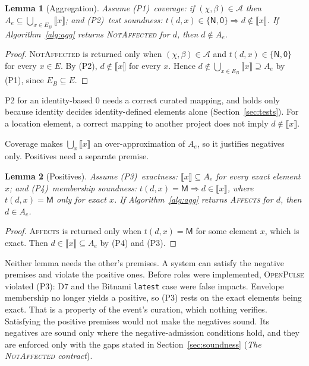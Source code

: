 \documentclass[11pt,a4paper]{article}
\newtheorem{lemma}{Lemma}
\newcommand{\op}{\textsc{OpenPulse}}
\newcommand{\code}[1]{\texttt{#1}}
\newcommand{\Mem}{\textsf{M}}
\newcommand{\Non}{\textsf{N}}
\newcommand{\NoA}{\textsf{0}}
\begin{document}
\begin{lemma}[Aggregation]
\label{lem:agg}
Assume (P1)~\emph{coverage}: if $(\chi, \beta) \in \mathcal{A}$ then
$A_e \subseteq \bigcup_{x \in E_B} \llbracket x \rrbracket$; and
(P2)~\emph{test soundness}: $t(d,x) \in \{\Non, \NoA\} \Rightarrow
d \notin \llbracket x \rrbracket$. If Algorithm~\ref{alg:agg} returns
\textsc{NotAffected} for $d$, then $d \notin A_e$.
\end{lemma}
\begin{proof}
\textsc{NotAffected} is returned only when $(\chi, \beta) \in
\mathcal{A}$ and $t(d,x) \in \{\Non, \NoA\}$ for every $x \in E$. By
(P2), $d \notin \llbracket x\rrbracket$ for every $x$. Hence
$d \notin \bigcup_{x \in E_B} \llbracket x \rrbracket \supseteq A_e$
by (P1), since $E_B \subseteq E$.
\end{proof}
P2 for an identity-based \NoA{} needs a correct curated mapping, and
holds only because identity decides identity-defined elements alone
(Section~\ref{sec:tests}). For a location element, a correct mapping
to another project does not imply $d \notin \llbracket x\rrbracket$.

Coverage makes $\bigcup_x \llbracket x\rrbracket$ an over-approximation
of $A_e$, so it justifies negatives only. Positives need a separate
premise.

\begin{lemma}[Positives]
\label{lem:pos}
Assume (P3)~\emph{exactness}: $\llbracket x\rrbracket \subseteq A_e$
for every exact element $x$; and (P4)~\emph{membership soundness}:
$t(d,x) = \Mem \Rightarrow d \in \llbracket x\rrbracket$, where
$t(d,x) = \Mem$ only for exact $x$. If Algorithm~\ref{alg:agg} returns
\textsc{Affects} for $d$, then $d \in A_e$.
\end{lemma}
\begin{proof}
\textsc{Affects} is returned only when $t(d,x) = \Mem$ for some
element $x$, which is exact. Then $d \in \llbracket x\rrbracket
\subseteq A_e$ by (P4) and (P3).
\end{proof}

Neither lemma needs the other's premises. A system can satisfy the
negative premises and violate the positive ones. Before roles were
implemented, \op{} violated (P3): D7 and the Bitnami \code{latest} case
were false impacts. Envelope membership no longer yields a positive, so (P3) rests on the exact elements being exact.
That is a property of the event's curation, which nothing verifies.
Satisfying the positive premises would not make the negatives sound. Its negatives are
sound only where the negative-admission conditions hold, and they are
enforced only with the gaps stated in Section~\ref{sec:soundness}
(\emph{The \textsc{NotAffected} contract}).
\end{document}
